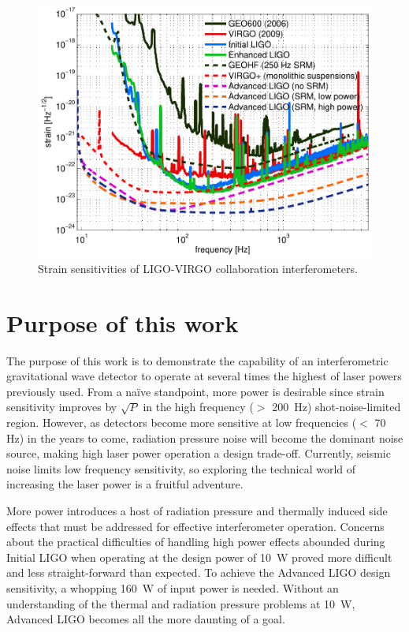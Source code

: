 \begin{figure}
\begin{centering}
\includegraphics[width=1.0\textwidth]{figures/GWnetwork_strains.pdf}
\caption[Strain sensitivities of LIGO-VIRGO collaboration interferometers]{Strain sensitivities of LIGO-VIRGO collaboration interferometers.}
\label{fig:h_all}
\end{centering}
\end{figure}


\section{Purpose of this work}
The purpose of this work is to demonstrate the capability of an
interferometric gravitational wave detector to operate at several
times the highest of laser powers previously used. From a na\"ive
standpoint, more power is desirable since strain sensitivity improves
by $\sqrt{P}$ in the high frequency ($>$ 200~Hz) shot-noise-limited
region. However, as detectors become more sensitive at low frequencies
($<$ 70 Hz) in the years to come, radiation pressure noise will become
the dominant noise source, making high laser power operation a design
trade-off. Currently, seismic noise limits low frequency sensitivity,
so exploring the technical world of increasing the laser power is a
fruitful adventure.

More power introduces a host of radiation pressure and thermally
induced side effects that must be addressed for effective
interferometer operation. Concerns about the practical difficulties of
handling high power effects abounded during Initial LIGO when
operating at the design power of 10~W proved more difficult and less
straight-forward than expected. To achieve the Advanced LIGO design
sensitivity, a whopping 160~W of input power is needed. Without an
understanding of the thermal and radiation pressure problems at 10~W,
Advanced LIGO becomes all the more daunting of a goal. 

